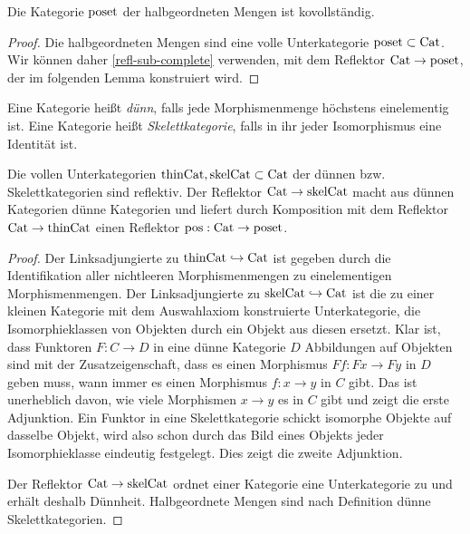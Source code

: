 \begin{prop} \label{poset-cocomplete}
  Die Kategorie $\operatorname{poset}$ der halbgeordneten Mengen ist kovollständig.
\end{prop}
\begin{proof}
  Die halbgeordneten Mengen sind eine volle Unterkategorie $\operatorname{poset}
  \subset \operatorname{Cat}$. Wir können daher \ref{refl-sub-complete} verwenden,
  mit dem Reflektor $\operatorname{Cat} \to \operatorname{poset}$, der im folgenden Lemma
  konstruiert wird.
\end{proof}
\begin{defn}
  Eine Kategorie heißt \emph{dünn}, falls jede Morphismenmenge
  höchs\-tens einelementig ist. Eine Kategorie heißt
  \emph{Skelettkategorie}, falls in ihr jeder Isomorphismus eine
  Identität ist.
\end{defn}
\begin{lemma} \label{poset-reflective}
  Die vollen Unterkategorien $\mathrm{thinCat}, \mathrm{skelCat}
  \subset \operatorname{Cat}$ der dünnen bzw. Skelettkategorien sind reflektiv. Der
  Reflektor $\operatorname{Cat} \to \mathrm{skelCat}$ macht aus dünnen Kategorien
  dünne Kategorien und liefert durch Komposition mit dem Reflektor
  $\operatorname{Cat} \to \mathrm{thinCat}$ einen Reflektor $\operatorname{pos}: \operatorname{Cat} \to \operatorname{poset}$.
\end{lemma}
\begin{proof}
  Der Linksadjungierte zu $\mathrm{thinCat} \hookrightarrow \operatorname{Cat}$ ist gegeben
  durch die Identifikation aller nichtleeren Morphismenmengen zu
  einelementigen Morphismenmengen. Der Linksadjungierte zu
  $\mathrm{skelCat} \hookrightarrow \operatorname{Cat}$ ist die zu einer kleinen Kategorie mit
  dem Auswahlaxiom konstruierte Unterkategorie, die Isomorphieklassen
  von Objekten durch ein Objekt aus diesen ersetzt. Klar ist, dass
  Funktoren $F: C \to D$ in eine dünne Kategorie $D$ Abbildungen auf
  Objekten sind mit der Zusatzeigenschaft, dass es einen Morphismus
  $Ff: Fx \to Fy$ in $D$ geben muss, wann immer es einen Morphismus
  $f: x \to y$ in $C$ gibt. Das ist unerheblich davon, wie viele
  Morphismen $x \to y$ es in $C$ gibt und zeigt die erste
  Adjunktion. Ein Funktor in eine Skelettkategorie schickt isomorphe
  Objekte auf dasselbe Objekt, wird also schon durch das Bild eines
  Objekts jeder Isomorphieklasse eindeutig festgelegt. Dies zeigt die
  zweite Adjunktion.

  Der Reflektor $\operatorname{Cat} \to \mathrm{skelCat}$ ordnet einer Kategorie
  eine Unterkategorie zu und erhält deshalb Dünnheit. Halbgeordnete
  Mengen sind nach Definition dünne Skelettkategorien.
\end{proof}


